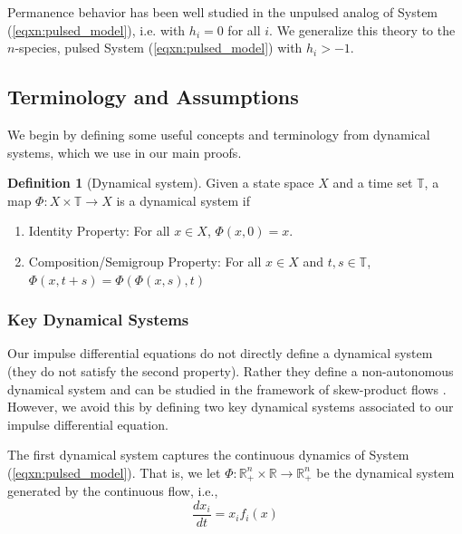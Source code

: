\documentclass{article}
\theoremstyle{definition}
\newtheorem{definition}{Definition}[section]
\newcommand{\R}{{\mathbb{R}}}
\begin{document}
Permanence behavior has been well studied in the unpulsed analog of System (\ref{eqxn:pulsed_model}), i.e. with $h_i = 0$ for all $i$. We generalize this theory to the $n$-species, pulsed System (\ref{eqxn:pulsed_model}) with $h_i > -1$.

\subsection{Terminology and Assumptions}
We begin by defining some useful concepts and terminology from dynamical systems, which we use in our main proofs. 

\begin{definition}[Dynamical system]
Given a state space $X$ and a time set $\mathbb{T}$, a map $\Phi: X\times \mathbb{T} \rightarrow  X$ is a dynamical system if 
\begin{enumerate}
    \item Identity Property: For all $x \in X$, $\Phi(x,0) = x$.
    \item Composition/Semigroup Property: For all $x \in X$ and $t, s \in \mathbb{T}$, $\Phi(x,t+s) = \Phi(\Phi(x,s),t)$
\end{enumerate}
\end{definition}

\subsubsection{Key Dynamical Systems}
Our impulse differential equations do not directly define a dynamical system (they do not satisfy the second property).  Rather they define a non-autonomous dynamical system and can be studied in the framework of skew-product flows \cite{zhao2001uniform, mierczynski2004uniform}.  However, we avoid this by defining two key dynamical systems associated to our impulse differential equation.

The first dynamical system captures the continuous dynamics of System (\ref{eqxn:pulsed_model}). That is, we let $\Phi: \R_+^n \times \R \rightarrow \R_+^n$ be the dynamical system generated by the continuous flow, i.e., 
\begin{equation}\label{contflow}
    \frac{dx_i}{dt} = x_if_i(x)
\end{equation}
\end{document}
